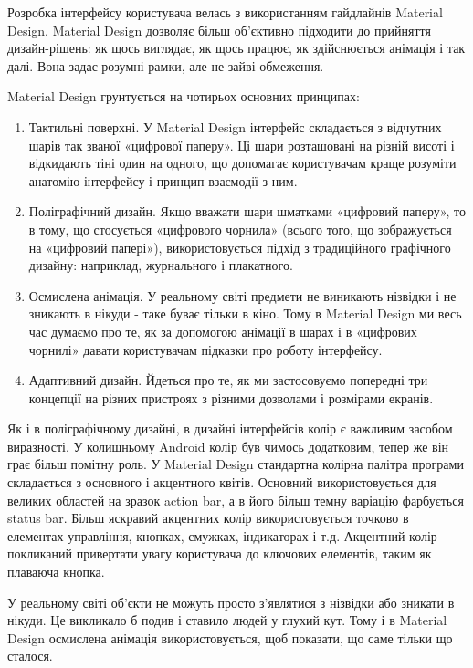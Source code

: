 \documentclass[../main.tex]{subfiles}
\begin{document}
			Розробка інтерфейсу користувача велась з використанням гайдлайнів Material Design.\cite{material_design} Material Design дозволяє більш об'єктивно підходити до прийняття дизайн-рішень: як щось виглядає, як щось працює, як здійснюється анімація і так далі. Вона задає розумні рамки, але не зайві обмеження.
			
			Material Design грунтується на чотирьох основних принципах:
			\begin{enumerate}
				\item Тактильні поверхні. У Material Design інтерфейс складається з відчутних шарів так званої «цифрової паперу». Ці шари розташовані на різній висоті і відкидають тіні один на одного, що допомагає користувачам краще розуміти анатомію інтерфейсу і принцип взаємодії з ним.
				\item Поліграфічний дизайн. Якщо вважати шари шматками «цифровий паперу», то в тому, що стосується «цифрового чорнила» (всього того, що зображується на «цифровий папері»), використовується підхід з традиційного графічного дизайну: наприклад, журнального і плакатного.
				\item Осмислена анімація. У реальному світі предмети не виникають нізвідки і не зникають в нікуди - таке буває тільки в кіно. Тому в Material Design ми весь час думаємо про те, як за допомогою анімації в шарах і в «цифрових чорнилі» давати користувачам підказки про роботу інтерфейсу.
				\item Адаптивний дизайн. Йдеться про те, як ми застосовуємо попередні три концепції на різних пристроях з різними дозволами і розмірами екранів.
			\end{enumerate}
			
			Як і в поліграфічному дизайні, в дизайні інтерфейсів колір є важливим засобом виразності. У колишньому Android колір був чимось додатковим, тепер же він грає більш помітну роль. У Material Design стандартна колірна палітра програми складається з основного і акцентного квітів. Основний використовується для великих областей на зразок action bar, а в його більш темну варіацію фарбується status bar. Більш яскравий акцентних колір використовується точково в елементах управління, кнопках, смужках, індикаторах і т.д. Акцентний колір покликаний привертати увагу користувача до ключових елементів, таким як плаваюча кнопка.
			
			У реальному світі об'єкти не можуть просто з'являтися з нізвідки або зникати в нікуди. Це викликало б подив і ставило людей у глухий кут. Тому і в Material Design осмислена анімація використовується, щоб показати, що саме тільки що сталося.
			
\end{document}
